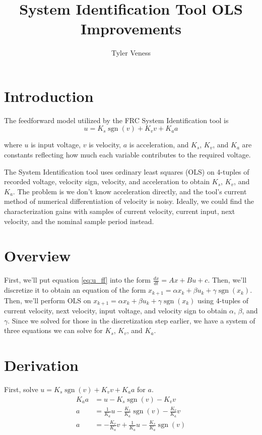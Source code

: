 \documentclass[10pt,conference,compsoc]{IEEEtran}
\DeclareMathOperator{\sgn}{sgn}
\begin{document}
\title{System Identification Tool OLS Improvements}
\author{Tyler Veness}
\maketitle

\section{Introduction}

The feedforward model utilized by the FRC System Identification tool is
\begin{equation}
  u = K_s\sgn(v) + K_v v + K_a a \label{eq:u_ff}
\end{equation}

where $u$ is input voltage, $v$ is velocity, $a$ is acceleration, and $K_s$,
$K_v$, and $K_a$ are constants reflecting how much each variable contributes to
the required voltage.

The System Identification tool uses ordinary least squares (OLS) on 4-tuples of
recorded voltage, velocity sign, velocity, and acceleration to obtain $K_s$,
$K_v$, and $K_a$. The problem is we don't know acceleration directly, and the
tool's current method of numerical differentiation of velocity is noisy.
Ideally, we could find the characterization gains with samples of current
velocity, current input, next velocity, and the nominal sample period instead.

\section{Overview}

First, we'll put equation \eqref{eq:u_ff} into the form
$\frac{dx}{dt} = Ax + Bu + c$. Then, we'll discretize it to obtain an equation
of the form $x_{k+1} = \alpha x_k + \beta u_k + \gamma\sgn(x_k)$. Then, we'll
perform OLS on $x_{k+1} = \alpha x_k + \beta u_k + \gamma\sgn(x_k)$ using
4-tuples of current velocity, next velocity, input voltage, and velocity sign to
obtain $\alpha$, $\beta$, and $\gamma$. Since we solved for those in the
discretization step earlier, we have a system of three equations we can solve
for $K_s$, $K_v$, and $K_a$.

\section{Derivation}

First, solve $u = K_s\sgn(v) + K_v v + K_a a$ for $a$.
\begin{align*}
  K_a a &= u - K_s\sgn(v) - K_v v \\
  a &= \frac{1}{K_a} u - \frac{K_s}{K_a}\sgn(v) - \frac{K_v}{K_a} v \\
  a &= -\frac{K_v}{K_a} v + \frac{1}{K_a} u - \frac{K_s}{K_a}\sgn(v)
\end{align*}
\end{document}
